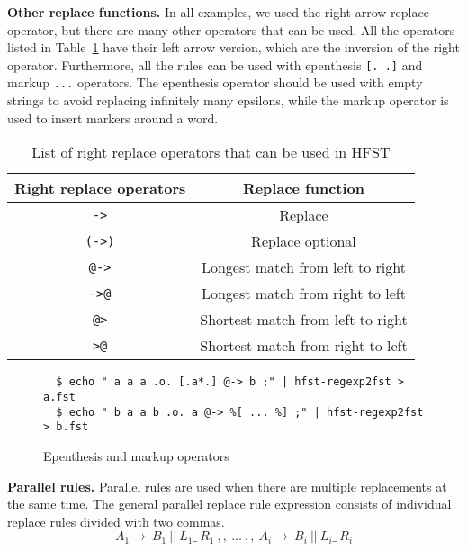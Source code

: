 \documentclass{llncs}
\begin{document}

\textbf{Other replace functions.} In all examples, we used the right arrow replace operator,
but there are many other operators that can be used. 
All the operators listed in Table~\ref{tab:replace_operators} have their left arrow version, 
which are the inversion of the right operator. Furthermore, all the rules can be used 
with epenthesis \verb![. .]! and markup \verb!...! operators. 
The epenthesis operator should be used with empty strings to avoid replacing infinitely 
many epsilons, while the markup operator is used to insert markers around a word.

\begin{table} [h!]
  \centering
  \caption{List of right replace operators that can be used in HFST}
  \begin{tabular}{| c | c |} 
    \hline
    Right replace operators & Replace function \\ \hline\hline
    \verb!->!   & Replace \\ \hline
    \verb!(->)! & Replace optional \\ \hline
    \verb!@->!  & Longest match from left to right \\ \hline
    \verb!->@!  & Longest match from right to left \\ \hline
    \verb!@>!   & Shortest match from left to right \\ \hline
    \verb!>@!   & Shortest match from right to left \\ \hline
  \end{tabular}
  \label{tab:replace_operators}
\end{table}



\begin{figure} [h!]
\begin{verbatim}
  $ echo " a a a .o. [.a*.] @-> b ;" | hfst-regexp2fst > a.fst
  $ echo " b a a b .o. a @-> %[ ... %] ;" | hfst-regexp2fst > b.fst
\end{verbatim}
\caption{Epenthesis and markup operators}
\label{fig:epenthesis_markup}
\end{figure}



\textbf{Parallel rules.} Parallel rules are used when there are 
multiple replacements at the same time. The general parallel replace rule expression 
consists of individual replace rules divided with two commas.
\begin{equation}
  A_1 \rightarrow\ B_1\ ||\ L_1 \_\  R_1\ ,,\ \ldots\ ,,\ A_i \rightarrow\ B_i\ ||\ L_i \_\ R_i
\end{equation}
\end{document}
